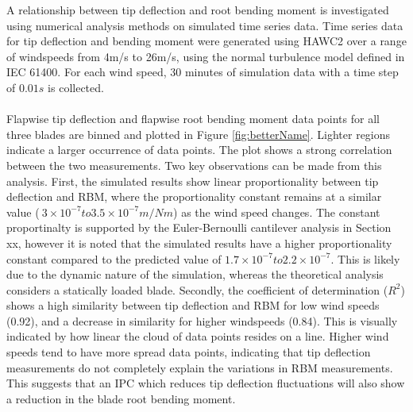 A relationship between tip deflection and root bending moment is investigated using numerical analysis methods on simulated time series data. Time series data for tip deflection and bending moment were generated using HAWC2 over a range of windspeeds from 4m/s to 26m/s, using the normal turbulence model defined in IEC 61400. For each wind speed, 30 minutes of simulation data with a time step of $0.01s$ is collected. 
\\~\\
Flapwise tip deflection and flapwise root bending moment data points for all three blades are binned and plotted in Figure \ref{fig:betterName}. Lighter regions indicate a larger occurrence of data points. The plot shows a strong correlation between the two measurements. Two key observations can be made from this analysis. First, the simulated results show linear proportionality between tip deflection and RBM, where the proportionality constant remains at a similar value ($~3\times 10^{-7} to 3.5\times 10^{-7} m/Nm$) as the wind speed changes. The constant proportinalty is supported by the Euler-Bernoulli cantilever analysis in Section xx, however it is noted that the simulated results have a higher proportionality constant compared to the predicted value of $1.7 \times 10^{-7} to 2.2 \times 10^{-7}$. This is likely due to the dynamic nature of the simulation, whereas the theoretical analysis considers a statically loaded blade. Secondly, the coefficient of determination ($R^2$) shows a high similarity between tip deflection and RBM for low wind speeds (0.92), and a decrease in similarity for higher windspeeds (0.84). This is visually indicated by how linear the cloud of data points resides on a line. Higher wind speeds tend to have more spread data points, indicating that tip deflection measurements do not completely explain the variations in RBM measurements. This suggests that an IPC which reduces tip deflection fluctuations will also show a reduction in the blade root bending moment.


